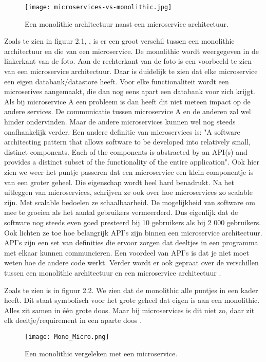 \begin{figure}[h]
	\texttt{[image: microservices-vs-monolithic.jpg]}
	\centering
	\caption{Een monolithic architectuur naast een microservice architectuur. \textcite{Watts2018}}
\end{figure}
Zoals te zien in figuur 2.1, \textcite{Watts2018}, is er een groot verschil tussen een monolithic architectuur en die van een microservice. De monolithic wordt weergegeven in de linkerkant van de foto. Aan de rechterkant van de foto is een voorbeeld te zien van een microservice architectuur. Daar is duidelijk te zien dat elke microservice een eigen databank/datastore heeft. Voor elke functionaliteit wordt een microserives aangemaakt, die dan nog eens apart een databank voor zich krijgt. Als bij microservice A een probleem is dan heeft dit niet meteen impact op de andere services. De communicatie tussen microservice A en de anderen zal wel hinder ondervinden. Maar de andere microservices kunnen wel nog steeds onafhankelijk verder. 
Een andere definitie van microservices is: "A software architecting pattern that allows software to be developed into relatively small, distinct components. Each of the components is abstracted by an API(s) and provides a distinct subset of the functionality of the entire application". Ook hier zien we weer het puntje passeren dat een microservice een klein componentje is van een groter geheel. Die eigenschap wordt heel hard benadrukt. Na het uitleggen van microservices, schrijven ze ook over hoe microservices zo scalable zijn. Met scalable bedoelen ze schaalbaarheid. De mogelijkheid van software om mee te groeien als het aantal gebruikers vermeerderd. Dus eigenlijk dat de software nog steeds even goed presteerd bij 10 gebruikers als bij 2 000 gebruikers. Ook lichten ze toe hoe belangrijk API's zijn binnen een microservice architectuur. API's zijn een set van definities die ervoor zorgen dat deeltjes in een programma met elkaar kunnen communcieren. Een voordeel van API's is dat je niet moet weten hoe de andere code werkt. Verder wordt er ook gepraat over de verschillen tussen een monolithic architectuur en een microservice architectuur \textcite{series2018}.


 Zoals te zien is in figuur 2.2. We zien dat de monolithic alle puntjes in een kader heeft. Dit staat symbolisch voor het grote geheel dat eigen is aan een monolithic. Alles zit samen in één grote doos. Maar bij microservices is dit niet zo, daar zit elk deeltje/requirement in een aparte doos \textcite{Benetis2016a} . 
\begin{figure}[h]
	\texttt{[image: Mono\_Micro.png]}
	\centering
	\caption{Een monolithic vergeleken met een microservice. \textcite{Benetis2016a}}
\end{figure}

